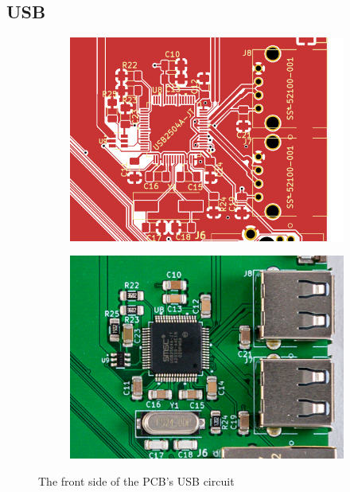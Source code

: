 \subsection{USB}\label{subsec:DesigningUSB}

\begin{figure}[t]
  \centering
  \begin{subfigure}{.5\textwidth}
    \centering
    \includegraphics[width=.75\linewidth]{Figures/kicad/close-ups/usb-front}
  \end{subfigure}%
  \begin{subfigure}{.5\textwidth}
    \centering
    \includegraphics[width=.75\linewidth]{Figures/pcb/crops/usb}
  \end{subfigure}
  \caption[PCB USB Circuit]{The front side of the PCB's USB circuit}
  \label{fig:USBCircuit}
\end{figure}

